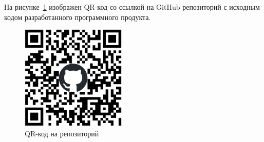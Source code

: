 
На рисунке~\ref{qr} изображен QR-код со ссылкой на GitHub репозиторий с исходным кодом разработанного программного продукта.

\begin{figure}
    \includegraphics[width=5cm]{img/qr-git.eps}
    \caption{QR-код на репозиторий}
    \label{qr}
\end{figure}
